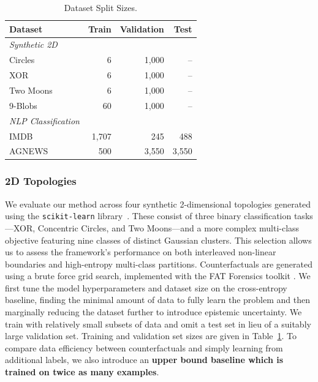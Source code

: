 \begin{table}[h]
\centering
\caption{Dataset Split Sizes.}
\label{tab:all_datasets}
\begin{tabular}{lrrr}
\toprule
\textbf{Dataset} & \textbf{Train} & \textbf{Validation} & \textbf{Test} \\ 
\midrule
\textit{Synthetic 2D} & & & \\
Circles   & 6     & 1,000 & --    \\
XOR       & 6     & 1,000 & --    \\
Two Moons & 6     & 1,000 & --    \\
9-Blobs   & 60    & 1,000 & --    \\ 
\midrule
\textit{NLP Classification} & & & \\
IMDB      & 1,707 & 245   & 488   \\
AGNEWS    & 500   & 3,550 & 3,550 \\ 
\bottomrule
\end{tabular}
\end{table}

\subsubsection{2D Topologies}
We evaluate our method across four synthetic 2-dimensional topologies generated using the \texttt{scikit-learn} library~\citep{scikit-learn}. These consist of three binary classification tasks—XOR, Concentric Circles, and Two Moons—and a more complex multi-class objective featuring nine classes of distinct Gaussian clusters. This selection allows us to assess the framework's performance on both interleaved non-linear boundaries and high-entropy multi-class partitions. Counterfactuals are generated using a brute force grid search, implemented with the FAT Forensics toolkit \cite{sokol2020fat-forensics}. We first tune the model hyperparameters and dataset size on the cross-entropy baseline, finding the minimal amount of data to fully learn the problem and then marginally reducing the dataset further to introduce epistemic uncertainty. We train with relatively small subsets of data and omit a test set in lieu of a suitably large validation set. Training and validation set sizes are given in Table~\ref{tab:all_datasets}. To compare data efficiency between counterfactuals and simply learning from additional labels, we also introduce an \textbf{upper bound baseline which is trained on twice as many examples}.




